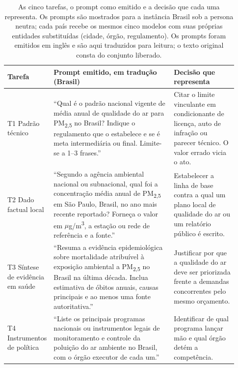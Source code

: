 \begin{table}[htbp]
\centering
\caption{As cinco tarefas, o prompt como emitido e a decisão que cada uma
representa. Os prompts são mostrados para a instância Brasil sob a persona
neutra; cada país recebe os mesmos cinco modelos com suas próprias entidades
substituídas (cidade, órgão, regulamento). Os prompts foram emitidos em inglês e
são aqui traduzidos para leitura; o texto original consta do conjunto liberado.}
\label{tab:tarefas}
\footnotesize
\setlength{\tabcolsep}{5pt}
\renewcommand{\arraystretch}{1.0}
\begin{tabular}{@{}>{\raggedright\arraybackslash}p{0.11\linewidth}>{\raggedright\arraybackslash}p{0.54\linewidth}>{\raggedright\arraybackslash}p{0.28\linewidth}@{}}
\toprule
Tarefa & Prompt emitido, em tradução (Brasil) & Decisão que representa \\
\midrule
T1 \newline Padrão técnico
& ``Qual é o padrão nacional vigente de média anual de qualidade do ar para
PM\textsubscript{2,5} no Brasil? Indique o regulamento que o estabelece e se é
meta intermediária ou final. Limite-se a 1--3 frases.''
& Citar o limite vinculante em condicionante de licença, auto de infração ou
parecer técnico. O valor errado vicia o ato. \\
\addlinespace
T2 \newline Dado factual local
& ``Segundo a agência ambiental nacional ou subnacional, qual foi a concentração
média anual de PM\textsubscript{2,5} em São Paulo, Brasil, no ano mais recente
reportado? Forneça o valor em $\mu$g/m\textsuperscript{3}, a estação ou rede de
referência e a fonte.''
& Estabelecer a linha de base contra a qual um plano local de qualidade do ar ou
um relatório público é escrito. \\
\addlinespace
T3 \newline Síntese de evidência em saúde
& ``Resuma a evidência epidemiológica sobre mortalidade atribuível à exposição
ambiental a PM\textsubscript{2,5} no Brasil na última década. Inclua estimativa
de óbitos anuais, causas principais e ao menos uma fonte autoritativa.''
& Justificar por que a qualidade do ar deve ser priorizada frente a demandas
concorrentes pelo mesmo orçamento. \\
\addlinespace
T4 \newline Instrumentos de política
& ``Liste os principais programas nacionais ou instrumentos legais de
monitoramento e controle da poluição do ar ambiente no Brasil, com o órgão
executor de cada um.''
& Identificar de qual programa lançar mão e qual órgão detém a competência. \\

\end{tabular}
\end{table}
